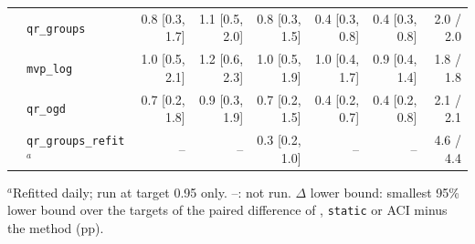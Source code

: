 \begin{tabular}{@{}llrrrrrr@{}}
 & \texttt{qr\_groups} & 0.8 [0.3, 1.7] & 1.1 [0.5, 2.0] & 0.8 [0.3, 1.5] & 0.4 [0.3, 0.8] & 0.4 [0.3, 0.8] & 2.0 / 2.0 \\
 & \texttt{mvp\_log} & 1.0 [0.5, 2.1] & 1.2 [0.6, 2.3] & 1.0 [0.5, 1.9] & 1.0 [0.4, 1.7] & 0.9 [0.4, 1.4] & 1.8 / 1.8 \\
 & \texttt{qr\_ogd} & 0.7 [0.2, 1.8] & 0.9 [0.3, 1.9] & 0.7 [0.2, 1.5] & 0.4 [0.2, 0.7] & 0.4 [0.2, 0.8] & 2.1 / 2.1 \\
 & \texttt{qr\_groups\_refit}$^{a}$ & -- & -- & 0.3 [0.2, 1.0] & -- & -- & 4.6 / 4.4 \\
\bottomrule
\end{tabular}

\smallskip\parbox{\linewidth}{\footnotesize $^{a}$Refitted daily; run at target 0.95 only. --: not run. $\Delta$ lower bound: smallest 95\% lower bound over the targets of the paired difference of \Dbar{}, \texttt{static} or ACI minus the method (pp).}
